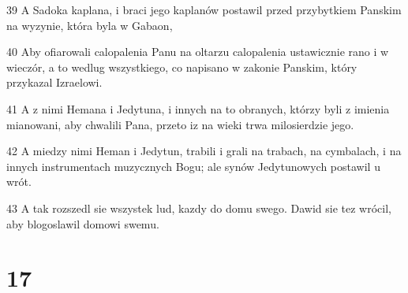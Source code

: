 \par 39 A Sadoka kaplana, i braci jego kaplanów postawil przed przybytkiem Panskim na wyzynie, która byla w Gabaon,
\par 40 Aby ofiarowali calopalenia Panu na oltarzu calopalenia ustawicznie rano i w wieczór, a to wedlug wszystkiego, co napisano w zakonie Panskim, który przykazal Izraelowi.
\par 41 A z nimi Hemana i Jedytuna, i innych na to obranych, którzy byli z imienia mianowani, aby chwalili Pana, przeto iz na wieki trwa milosierdzie jego.
\par 42 A miedzy nimi Heman i Jedytun, trabili i grali na trabach, na cymbalach, i na innych instrumentach muzycznych Bogu; ale synów Jedytunowych postawil u wrót.
\par 43 A tak rozszedl sie wszystek lud, kazdy do domu swego. Dawid sie tez wrócil, aby blogoslawil domowi swemu.

\chapter{17}

